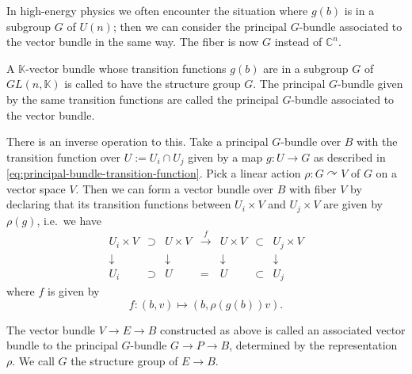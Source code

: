 \documentclass[12pt]{article}
\numberwithin{equation}{section}
\def\bC{\mathbb{C}}
\def\bK{\mathbb{K}}
\begin{document}
In high-energy physics we often encounter the situation where $g (b)$ is in a subgroup $G$ of $U(n)$;
then we can consider the principal $G$-bundle associated to the vector bundle in the same way.
The fiber is now $G$ instead of $\bC^n$.

\begin{definition}
  A $\bK$-vector bundle whose transition functions $g(b)$ are in a subgroup $G$ of $GL(n,\bK)$
  is called to have the structure group $G$.
  The principal $G$-bundle given by the same transition functions are called 
  the  principal $G$-bundle associated to the vector bundle.
\end{definition}

There is an inverse operation to this.
Take a principal $G$-bundle over $B$
with the transition function over $U:=U_i\cap U_j$ given by
a map $g: U\to G$ as described in \eqref{eq:principal-bundle-transition-function}.
Pick a linear action $\rho: G \curvearrowright V$ of $G$ on a vector space $V$.
Then we can form a vector bundle over $B$ with fiber $V$
by declaring that its transition functions 
between $U_i\times V$ and $U_j\times V$
are given by $\rho(g)$, i.e.~we have
\begin{equation}
  \begin{array}{cccccccc}
    U_i \times V &\supset& U \times V & \xrightarrow{f } & 
    U \times V & \subset & U_j\times V \\
    \downarrow & & \downarrow & & \downarrow & & \downarrow \\
    U_i & \supset & U  & = & U  & \subset & U_j
  \end{array}
\end{equation}
where $f $ is given by \begin{equation}
   f : (b,v) \mapsto (b, \rho(g (b)) v).
\end{equation}


\begin{definition}
  The vector bundle $V\to E\to B$ constructed as above is called 
  an associated vector bundle to the principal $G$-bundle $G\to P\to B$,
  determined by the representation $\rho$.
  We call $G$ the structure group of $E\to B$.
\end{definition}
\end{document}
